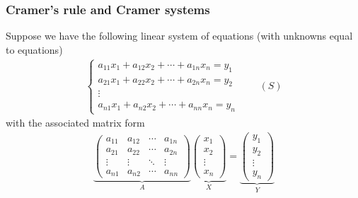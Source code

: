 \documentclass[usenames,dvipsnames,aspectratio=169,10pt]{beamer}
\numberwithin{equation}{section}
\begin{document}
\begin{frame}
\frametitle{Cramer's rule and Cramer systems}

Suppose we have the following linear system of equations (with unknowns equal to equations)
\begin{align*}
\begin{cases}
a_{11} x_1  + a_{12} x_2 + \cdots + a_{1n} x_n = y_1 \\
a_{21} x_1  + a_{22} x_2 + \cdots + a_{2n} x_n = y_2 \\
\vdots \\
a_{n1} x_1  + a_{n2} x_2 + \cdots + a_{nn} x_n = y_n
\end{cases}
\qquad (S)
\end{align*}
with the associated matrix form
\begin{align*}
\underbrace{
\begin{pmatrix}
a_{11} & a_{12} & \cdots & a_{1n} \\
a_{21} & a_{22} & \cdots & a_{2n} \\
\vdots & \vdots & \ddots & \vdots \\
a_{n1} & a_{n2} & \cdots & a_{nn}
\end{pmatrix}}_A
\underbrace{
\begin{pmatrix}
x_{1} \\
x_{2} \\
\vdots \\
x_{n}
\end{pmatrix}}_X
=
\underbrace{
\begin{pmatrix}
y_{1} \\
y_{2} \\
\vdots \\
y_{n}
\end{pmatrix}}_Y
\end{align*}
\end{frame}
\end{document}

